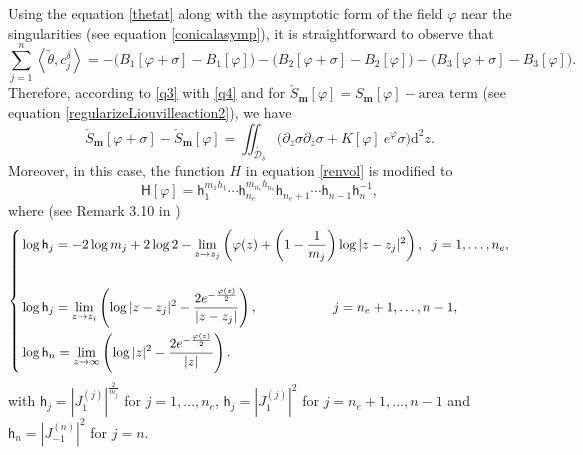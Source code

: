 \documentclass[a4paper,11pt]{article}
\newcommand{\dd}{\mathrm{d}}
\newcommand{\Lponetial}{\mathsf{h}}
\newcommand{\singfund}{\overset{{}_{\curlywedge}}{\mathcal{D}}}
\newcommand{\stks}[1]{
	 \left< #1 \right>
}
\begin{document}
Using the equation \eqref{thetat} along with the asymptotic form of the field $\varphi$ near the singularities (see equation \eqref{conicalasymp}), it is straightforward to observe that
\begin{equation}
\sum_{j=1}^{n}\stks{\tilde\theta,c_{j}^{\delta}} = - \Big(B_{1}[\varphi+\sigma]-B_{1}[\varphi]\Big)- \Big(B_{2}[\varphi+\sigma]-B_{2}[\varphi]\Big)- \Big(B_{3}[\varphi+\sigma]-B_{3}[\varphi]\Big).\label{q4}
\end{equation}
Therefore, according to \eqref{q3} with \eqref{q4} and for $\check S_{\boldsymbol{m}}[\varphi]=S_{\boldsymbol{m}}[\varphi]-\text{area term}$ (see equation \eqref{regularizeLiouvilleaction2}), we have
\begin{equation}
 \check S_{\boldsymbol{m}}[\varphi+\sigma]- \check S_{\boldsymbol{m}}[\varphi] = \iint_{\singfund_{\delta}}\Big(\partial_z \sigma\partial_{\bar{z}}\sigma +  K[\varphi] ~e^{\varphi} \sigma\Big) \dd^{2}z.\label{q5}
\end{equation}
Moreover, in this case, the function $H$ in equation \eqref{renvol} is modified to
\begin{equation}
\mathsf{H}[\varphi] = \Lponetial_{1}^{m_1h_1}\dotsm\Lponetial_{n_e}^{m_{n_e} h_{n_e}}\Lponetial_{n_e+1}\dotsm\Lponetial_{n-1}\Lponetial^{-1}_{n},\label{H2}
\end{equation}
where (see Remark 3.10 in \cite{Taghavi2024classical})
\begin{equation}\label{loghj}
\left\{
\begin{split}
& \log \Lponetial_{j} = -2 \log m_j + 2 \log 2 - \lim_{z \to z_{j}}\left(\varphi(z) + \left(1-\frac{1}{m_j}\right) \log|z-z_{j}|^2\right), \hspace{.2cm} j=1,\dots,n_e,\\ \\
&\log \Lponetial_{j} = \lim_{z \to z_{i}} \left(\log|z-z_{j}|^2 - \frac{2 e^{-\frac{\varphi(z)}{2}}}{|z-z_{j}|}\right),\hspace{2cm}  j=n_e+1,\dots,n-1,\\
& \log \Lponetial_{n} = \lim_{z \to \infty} \left(\log|z|^2 - \frac{2 e^{-\frac{\varphi(z)}{2}}}{|z|}\right).
\end{split}
\right.
\end{equation}
with $\Lponetial_j = \left| J^{(j)}_{1} \right|^{\frac{2}{m_j}}$ for $j=1,\dots,n_e$,  $\Lponetial_{j} =\left| J^{(j)}_{1} \right|^{2}$ for $j=n_e+1,\dots,n-1$ and $\Lponetial_{n}= \left| J^{(n)}_{-1} \right|^2$ for $j=n$.
\end{document}
